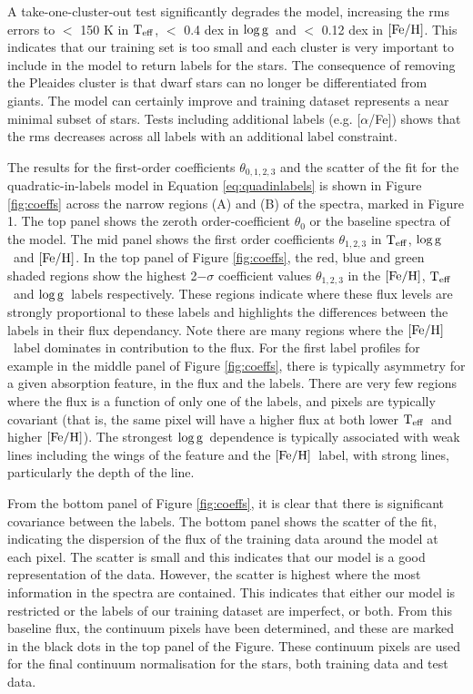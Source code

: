 \documentclass[12pt, preprint]{aastex}
\newcommand{\teff}{\mbox{$\rm T_{eff}$}}
\newcommand{\feh}{\mbox{$\rm [Fe/H]$}}
\newcommand{\logg}{\mbox{$\rm \log g$}}
\begin{document}
A take-one-cluster-out test significantly degrades the model, increasing the rms errors to $<$ 150 K in \teff, $<$ 0.4 dex in \logg\ and $<$ 0.12 dex in \feh. 
This indicates that our training set is too small and each cluster is very important to include in the model to return labels for the stars. 
The consequence of removing the Pleaides cluster is that dwarf stars can no longer be differentiated from giants.
 The model can certainly improve and training dataset represents a near minimal subset of stars. 
 Tests including additional labels (e.g. [$\alpha$/Fe]) shows that the rms decreases across all labels with an additional label constraint. 

The results for the first-order coefficients $\theta_{0,1,2,3}$ and the scatter of the fit for the quadratic-in-labels model in Equation \ref{eq:quadinlabels} is shown in Figure \ref{fig:coeffs} across the narrow regions (A) and (B) of the spectra, marked in Figure 1. 
The top panel shows the zeroth order-coefficient $\theta_0$ or the baseline spectra of the model. 
The mid panel shows the first order coefficients $\theta_{1,2,3}$ in \teff, \logg\ and \feh. 
In the top panel of Figure \ref{fig:coeffs}, the red, blue and green shaded regions show the highest 2$-\sigma$ coefficient values $\theta_{1,2,3}$ in the \feh, \teff\ and \logg\ labels respectively. 
These regions indicate where these flux levels are strongly proportional to these labels and highlights the differences between the labels in their flux dependancy. Note there are many regions where the \feh\ label dominates in contribution to the flux. 
For the first label profiles for example in the middle panel of Figure \ref{fig:coeffs}, there is typically asymmetry for a given absorption feature, in the flux and the labels. There are very few regions where the flux is a function of only one of the labels, and pixels are typically covariant (that is, the same pixel will have a higher flux at both lower \teff\ and higher \feh).
 The strongest \logg\ dependence is typically associated with weak lines including the wings of the feature and the \feh\ label, with strong lines, particularly the depth of the line. 

From the bottom panel of Figure \ref{fig:coeffs}, it is clear that there is significant covariance between the labels. 
The bottom panel shows the scatter of the fit, indicating the dispersion of the flux of the training data around the model at each pixel. 
The scatter is small and this indicates that our model is a good representation of the data. 
However, the scatter is highest where the most information in the spectra are contained. 
This indicates that either our model is restricted or the labels of our training dataset are imperfect, or both. 
From this baseline flux, the continuum pixels have been determined, and these are marked in the black dots in the top panel of the Figure. 
These continuum pixels are used for the final continuum normalisation for the stars, both training data and test data. 
\end{document}
